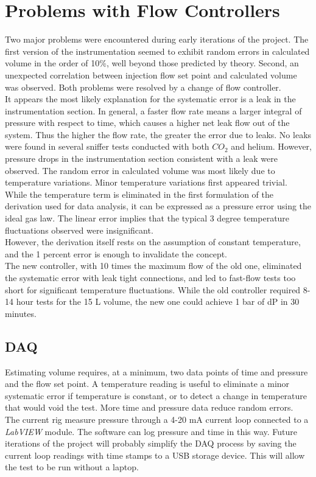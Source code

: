 \documentclass{report}
\begin{document}
\section{Problems with Flow Controllers}
Two major problems were encountered during early iterations of the project. 
The first version of the instrumentation seemed to exhibit random errors in calculated volume in the order of 10\%, well beyond those predicted by theory. Second, an unexpected correlation between injection flow set point and calculated volume was observed. 
Both problems were resolved by a change of flow controller. \\
It appears the most likely explanation for the systematic error is a leak in the instrumentation section. In general, a faster flow rate means a larger integral of pressure with respect to time, which causes a higher net leak flow out of the system. Thus the higher the flow rate, the greater the error due to leaks. 
No leaks were found in several sniffer tests conducted with both $CO_2$ and helium. However, pressure drops in the instrumentation section  consistent with a leak were observed.
The random error in calculated volume was most likely due to temperature variations. Minor temperature variations first appeared trivial. While the temperature term is eliminated in the first formulation of the derivation used for data analysis, it can be expressed as a pressure error using the ideal gas law. The linear error implies that the typical 3 degree temperature fluctuations observed were insignificant. \\However, the derivation itself rests on the assumption of constant temperature, and the 1 percent error is enough to invalidate the concept. \\
The new controller, with 10 times the maximum flow of the old one,  eliminated the systematic error with leak tight connections, and  led to fast-flow tests too short for significant temperature fluctuations. While the old controller required 8-14 hour tests for the 15 L volume, the new one could achieve 1 bar of dP in 30 minutes.
\subsection{DAQ}
Estimating volume requires, at a minimum, two data points of time and pressure and the flow set point. A temperature reading is useful to eliminate a minor systematic error if temperature is constant, or to detect a change in temperature that would void the test. More time and pressure data reduce random errors. \\
The current rig measure pressure through a 4-20 mA current loop connected to a \textit{LabVIEW} module. The software can log pressure and time in this way. Future iterations of the project will probably simplify the DAQ process by saving the current loop readings with time stamps to a USB storage device. This will allow the test to be run without a laptop. 
\end{document}
